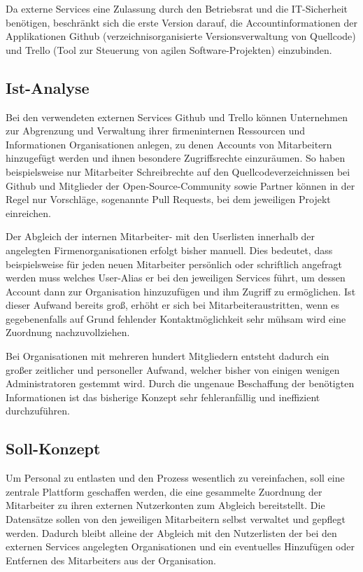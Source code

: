 Da externe Services eine Zulassung durch den Betriebsrat und die IT-Sicherheit benötigen, beschränkt
sich die erste Version darauf, die Accountinformationen der Applikationen Github
(verzeichnisorganisierte Versionsverwaltung von Quellcode) und Trello (Tool zur Steuerung von
agilen Software-Projekten) einzubinden.

\subsection{Ist-Analyse}
\label{sec:Ist-Analyse}
Bei den verwendeten externen Services Github und Trello können Unternehmen zur Abgrenzung und
Verwaltung ihrer firmeninternen Ressourcen und Informationen Organisationen anlegen, zu
denen Accounts von Mitarbeitern hinzugefügt werden und ihnen besondere Zugriffsrechte einzuräumen.
So haben beispielsweise nur Mitarbeiter Schreibrechte auf den Quellcodeverzeichnissen bei Github und
Mitglieder der Open-Source-Community sowie Partner können in der Regel nur Vorschläge, sogenannte
Pull Requests, bei dem jeweiligen Projekt einreichen.

Der Abgleich der internen Mitarbeiter- mit den Userlisten innerhalb der angelegten Firmenorganisationen
erfolgt bisher manuell. Dies bedeutet, dass beispielsweise für jeden neuen
Mitarbeiter persönlich oder schriftlich angefragt werden muss welches User-Alias er bei den
jeweiligen Services führt, um dessen Account dann zur Organisation hinzuzufügen und ihm
Zugriff zu ermöglichen. Ist dieser Aufwand bereits groß, erhöht er sich bei Mitarbeiteraustritten,
wenn es gegebenenfalls auf Grund fehlender Kontaktmöglichkeit sehr mühsam wird eine Zuordnung
nachzuvollziehen.

Bei Organisationen mit mehreren hundert Mitgliedern entsteht dadurch ein großer zeitlicher und
personeller Aufwand, welcher bisher von einigen wenigen Administratoren gestemmt wird. Durch die
ungenaue Beschaffung der benötigten Informationen ist das bisherige Konzept sehr fehleranfällig und
ineffizient durchzuführen.

\subsection{Soll-Konzept}
\label{sec:Soll-Konzept}
Um Personal zu entlasten und den Prozess wesentlich zu vereinfachen, soll eine
zentrale Plattform geschaffen werden, die eine gesammelte Zuordnung der Mitarbeiter zu ihren
externen Nutzerkonten zum Abgleich bereitstellt. Die Datensätze sollen von den jeweiligen
Mitarbeitern selbst verwaltet und gepflegt werden. Dadurch bleibt alleine der Abgleich mit den
Nutzerlisten der bei den externen Services angelegten Organisationen und ein eventuelles Hinzufügen
oder Entfernen des Mitarbeiters aus der Organisation.

